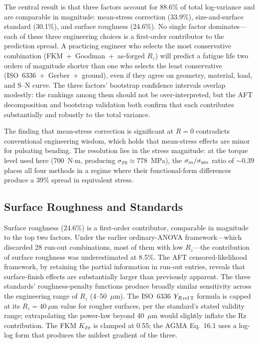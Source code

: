 \documentclass[12pt,a4paper]{article}
\begin{document}
The central result is that three factors account for 88.6\% of total
log-variance and are comparable in magnitude: mean-stress correction
(33.9\%), size-and-surface standard (30.1\%), and surface roughness
(24.6\%). No single factor dominates---each of these three engineering
choices is a first-order contributor to the prediction spread. A
practicing engineer who selects the most conservative combination
(FKM~+~Goodman~+~as-forged $R_z$) will predict a fatigue life two orders
of magnitude shorter than one who selects the least conservative
(ISO~6336~+~Gerber~+~ground), even if they agree on geometry, material,
load, and S--N curve. The three factors' bootstrap confidence intervals
overlap modestly: the rankings among them should not be over-interpreted,
but the AFT decomposition and bootstrap validation both confirm that each
contributes substantially and robustly to the total variance.

The finding that mean-stress correction is significant at $R=0$
contradicts conventional engineering wisdom, which holds that
mean-stress effects are minor for pulsating bending. The resolution lies
in the stress magnitude: at the torque level used here (700~N$\cdot$m,
producing $\sigma_{F0} \approx 778$~MPa), the $\sigma_m/\sigma_{\rm uts}$
ratio of $\sim$0.39 places all four methods in a regime where their
functional-form differences produce a 39\% spread in equivalent stress.

\subsection{Surface Roughness and Standards}

Surface roughness (24.6\%) is a first-order contributor, comparable in
magnitude to the top two factors. Under the earlier ordinary-ANOVA
framework---which discarded 28 run-out combinations, most of them with
low $R_z$---the contribution of surface roughness was underestimated at
8.5\%. The AFT censored-likelihood framework, by retaining the partial
information in run-out entries, reveals that surface-finish effects are
substantially larger than previously apparent. The three standards'
roughness-penalty functions produce broadly similar sensitivity across
the engineering range of $R_z$ (4--50~$\mu$m). The ISO~6336
$Y_{R\,\rm rel\,T}$ formula is capped at its $R_z=40~\mu$m value for
rougher surfaces, per the standard's stated validity range; extrapolating
the power-law beyond 40~$\mu$m would slightly inflate the Rz contribution.
The FKM $K_{F\sigma}$ is clamped at 0.55; the AGMA Eq.~16.1 uses a
log-log form that produces the mildest gradient of the three.
\end{document}
